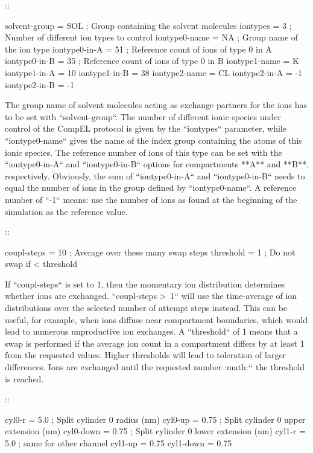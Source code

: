 ::

    solvent-group  = SOL      ; Group containing the solvent molecules
    iontypes       = 3        ; Number of different ion types to control
    iontype0-name  = NA       ; Group name of the ion type
    iontype0-in-A  = 51       ; Reference count of ions of type 0 in A
    iontype0-in-B  = 35       ; Reference count of ions of type 0 in B
    iontype1-name  = K
    iontype1-in-A  = 10
    iontype1-in-B  = 38
    iontype2-name  = CL
    iontype2-in-A  = -1
    iontype2-in-B  = -1

The group name of solvent molecules acting as exchange partners for the
ions has to be set with ``solvent-group``. The number of
different ionic species under control of the CompEL protocol is given by
the ``iontypes`` parameter, while
``iontype0-name`` gives the name of the index group
containing the atoms of this ionic species. The reference number of ions
of this type can be set with the ``iontype0-in-A`` and
``iontype0-in-B`` options for compartments **A** and **B**,
respectively. Obviously, the sum of ``iontype0-in-A`` and
``iontype0-in-B`` needs to equal the number of ions in the
group defined by ``iontype0-name``. A reference number of
``-1`` means: use the number of ions as found at the
beginning of the simulation as the reference value.

::

    coupl-steps    = 10       ; Average over these many swap steps
    threshold      = 1        ; Do not swap if < threshold

If ``coupl-steps`` is set to 1, then the momentary ion
distribution determines whether ions are exchanged.
``coupl-steps > 1`` will use the time-average of ion
distributions over the selected number of attempt steps instead. This
can be useful, for example, when ions diffuse near compartment
boundaries, which would lead to numerous unproductive ion exchanges. A
``threshold`` of 1 means that a swap is performed if the
average ion count in a compartment differs by at least 1 from the
requested values. Higher thresholds will lead to toleration of larger
differences. Ions are exchanged until the requested number :math:`\pm`
the threshold is reached.

::

    cyl0-r         = 5.0      ; Split cylinder 0 radius (nm)
    cyl0-up        = 0.75     ; Split cylinder 0 upper extension (nm)
    cyl0-down      = 0.75     ; Split cylinder 0 lower extension (nm)
    cyl1-r         = 5.0      ; same for other channel
    cyl1-up        = 0.75
    cyl1-down      = 0.75

